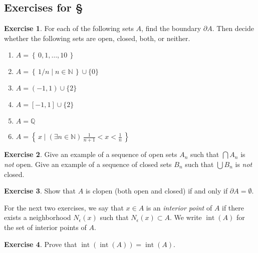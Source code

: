 \documentclass[11pt,oneside]{amsbook}
\newcommand{\set}[1]{\left\{\,#1\,\right\}}
\newcommand{\N}{\mathbb N}
\newcommand{\Q}{\mathbb Q}
\DeclareMathOperator{\inte}{int}
\theoremstyle{definition}
\newtheorem{exerc}{Exercise}[section]
\theoremstyle{plain}
\theoremstyle{definition}
\theoremstyle{remark}
\numberwithin{equation}{section}
\numberwithin{figure}{section}
\begin{document}

\newpage
\subsection*{Exercises for \S \thesection}

\begin{exerc}
  For each of the following sets $A$, find the boundary $\partial A$. Then decide whether the following sets are open, closed, both, or neither.
  \begin{enumerate}
    \item $A=\set{0,1,\ldots,10}$
    \item $A=\set{1/n\mid n\in\N}\cup\{0\}$
    \item $A=(-1,1)\cup\{2\}$
    \item $A=[-1,1]\cup\{2\}$
    \item $A=\Q$
    \item $A=\set{x\mid (\exists n\in\N)\,\frac1{n+1}<x<\frac1n}$
  \end{enumerate}
\end{exerc}

\begin{exerc}
  Give an example of a sequence of open sets $A_n$ such that $\bigcap A_n$ is \emph{not} open. Give an example of a sequence of closed sets $B_n$ such that $\bigcup B_n$ is \emph{not} closed.
\end{exerc}



\begin{exerc}
  Show that $A$ is clopen (both open and closed) if and only if $\partial A=\emptyset$.
\end{exerc}

For the next two exercises, we say that $x\in A$ is an \emph{interior point} of $A$ if there exists a neighborhood $N_\epsilon(x)$ such that $N_\epsilon(x)\subset A$. We write $\inte(A)$ for the set of interior points of $A$.

\begin{exerc}
  Prove that $\inte(\inte(A))=\inte(A)$.
\end{exerc}
\end{document}
